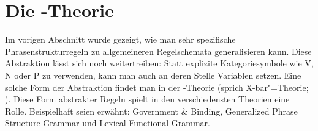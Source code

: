 



\section{Die \xbar-Theorie}
\label{sec-xbar}

Im vorigen Abschnitt wurde gezeigt, wie man sehr spezifische Phrasenstrukturregeln
zu allgemeineren Regelschemata generalisieren kann. Diese Abstraktion lässt sich
noch weitertreiben: Statt explizite Kategoriesymbole wie V, N oder P zu verwenden, kann man auch
an deren Stelle Variablen setzen. Eine solche Form der Abstraktion findet man in
der \xbar-Theorie (sprich X-bar"=Theorie; \citealt{Chomsky70a,Jackendoff77}). Diese Form abstrakter Regeln
spielt in den verschiedensten Theorien eine Rolle. Beispielhaft seien
erwähnt: Government \& Binding\indexgb \citep{Chomsky81a,FF87a,SS88a,Grewendorf88a},
Generalized Phrase Structure Grammar\indexgpsg \citep*{GKPS85a,Uszkoreit87a}
und Lexical Functional Grammar\indexlfg \citep{Bresnan82a-ed,Bresnan2001a,BF96a-ed,Dalrymple2023a-ed}.

